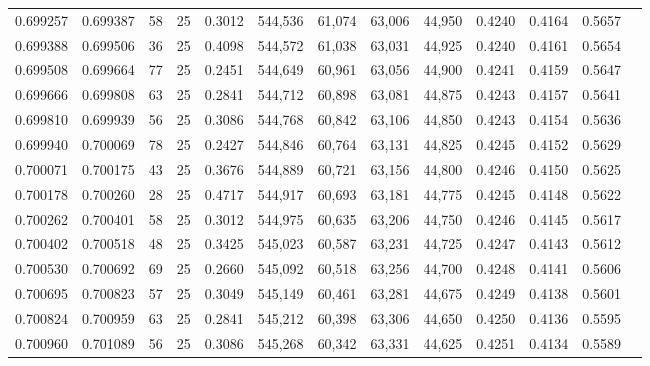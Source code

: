 \begin{tabular}{rrrrrrrrrrrrr}
0.699257 & 0.699387 &    58 &  25 &                                     0.3012 & 544,536 &  61,074 &  63,006 &  44,950 & 0.4240 & 0.4164 & 0.5657 \\
0.699388 & 0.699506 &    36 &  25 &                                     0.4098 & 544,572 &  61,038 &  63,031 &  44,925 & 0.4240 & 0.4161 & 0.5654 \\
0.699508 & 0.699664 &    77 &  25 &                                     0.2451 & 544,649 &  60,961 &  63,056 &  44,900 & 0.4241 & 0.4159 & 0.5647 \\
0.699666 & 0.699808 &    63 &  25 &                                     0.2841 & 544,712 &  60,898 &  63,081 &  44,875 & 0.4243 & 0.4157 & 0.5641 \\
0.699810 & 0.699939 &    56 &  25 &                                     0.3086 & 544,768 &  60,842 &  63,106 &  44,850 & 0.4243 & 0.4154 & 0.5636 \\
0.699940 & 0.700069 &    78 &  25 &                                     0.2427 & 544,846 &  60,764 &  63,131 &  44,825 & 0.4245 & 0.4152 & 0.5629 \\
0.700071 & 0.700175 &    43 &  25 &                                     0.3676 & 544,889 &  60,721 &  63,156 &  44,800 & 0.4246 & 0.4150 & 0.5625 \\
0.700178 & 0.700260 &    28 &  25 &                                     0.4717 & 544,917 &  60,693 &  63,181 &  44,775 & 0.4245 & 0.4148 & 0.5622 \\
0.700262 & 0.700401 &    58 &  25 &                                     0.3012 & 544,975 &  60,635 &  63,206 &  44,750 & 0.4246 & 0.4145 & 0.5617 \\
0.700402 & 0.700518 &    48 &  25 &                                     0.3425 & 545,023 &  60,587 &  63,231 &  44,725 & 0.4247 & 0.4143 & 0.5612 \\
0.700530 & 0.700692 &    69 &  25 &                                     0.2660 & 545,092 &  60,518 &  63,256 &  44,700 & 0.4248 & 0.4141 & 0.5606 \\
0.700695 & 0.700823 &    57 &  25 &                                     0.3049 & 545,149 &  60,461 &  63,281 &  44,675 & 0.4249 & 0.4138 & 0.5601 \\
0.700824 & 0.700959 &    63 &  25 &                                     0.2841 & 545,212 &  60,398 &  63,306 &  44,650 & 0.4250 & 0.4136 & 0.5595 \\
0.700960 & 0.701089 &    56 &  25 &                                     0.3086 & 545,268 &  60,342 &  63,331 &  44,625 & 0.4251 & 0.4134 & 0.5589 \\

\end{tabular}
